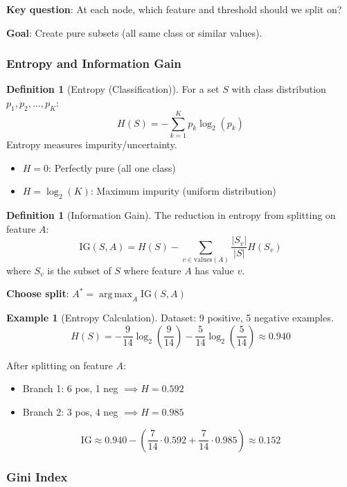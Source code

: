 \documentclass[11pt,twoside]{article}
\numberwithin{equation}{section}
\DeclareMathOperator*{\argmax}{arg\,max}
\theoremstyle{plain}
\theoremstyle{definition}
\newtheorem{definition}[theorem]{Definition}
\newtheorem{example}[theorem]{Example}
\theoremstyle{remark}
\begin{document}
\textbf{Key question}: At each node, which feature and threshold should we split on?

\textbf{Goal}: Create pure subsets (all same class or similar values).

\subsubsection{Entropy and Information Gain}

\begin{definition}[Entropy (Classification)]
For a set $S$ with class distribution $p_1, p_2, \ldots, p_K$:
\[
H(S) = -\sum_{k=1}^K p_k \log_2(p_k)
\]
Entropy measures impurity/uncertainty.
\begin{itemize}
\item $H = 0$: Perfectly pure (all one class)
\item $H = \log_2(K)$: Maximum impurity (uniform distribution)
\end{itemize}
\end{definition}

\begin{definition}[Information Gain]
The reduction in entropy from splitting on feature $A$:
\[
\text{IG}(S, A) = H(S) - \sum_{v \in \text{values}(A)} \frac{|S_v|}{|S|} H(S_v)
\]
where $S_v$ is the subset of $S$ where feature $A$ has value $v$.

\textbf{Choose split}: $A^* = \argmax_A \text{IG}(S, A)$
\end{definition}

\begin{example}[Entropy Calculation]
Dataset: 9 positive, 5 negative examples.
\[
H(S) = -\frac{9}{14}\log_2\left(\frac{9}{14}\right) - \frac{5}{14}\log_2\left(\frac{5}{14}\right) \approx 0.940
\]

After splitting on feature $A$:
\begin{itemize}
\item Branch 1: 6 pos, 1 neg $\implies H = 0.592$
\item Branch 2: 3 pos, 4 neg $\implies H = 0.985$
\end{itemize}
\[
\text{IG} \approx 0.940 - \left(\frac{7}{14} \cdot 0.592 + \frac{7}{14} \cdot 0.985\right) \approx 0.152
\]
\end{example}

\subsubsection{Gini Index}
\end{document}
